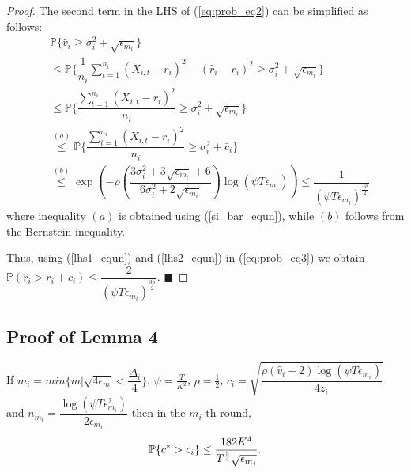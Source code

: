 \begin{proof}
 
The second term in the LHS of (\ref{eq:prob_eq2}) can be simplified as follows:
\begin{align}
&\mathbb{P}\bigg\lbrace \hat{v}_{i}\geq \sigma_{i}^{2}+\sqrt{\epsilon_{m_{i}}}\bigg\rbrace\nonumber\\
&\leq \mathbb{P}\bigg\lbrace \dfrac{1}{n_{i}}\sum_{t=1}^{n_{i}}(X_{i,t}-r_{i})^{2}-(\hat{r}_{i}-r_{i})^{2}\geq \sigma_{i}^{2}+\sqrt{\epsilon_{m_{i}}}\bigg\rbrace\nonumber\\
&\leq \mathbb{P}\bigg\lbrace \dfrac{\sum_{t=1}^{n_{i}}(X_{i,t}-r_{i})^{2}}{n_{i}}\geq \sigma_{i}^{2}+\sqrt{\epsilon_{m_{i}}} \bigg\rbrace\nonumber\\
&\overset{(a)}{\leq} \mathbb{P}\bigg\lbrace \dfrac{\sum_{t=1}^{n_{i}}(X_{i,t}-r_{i})^{2}}{n_{i}}\geq \sigma_{i}^{2} + \bar{c}_i\bigg\rbrace \nonumber\\
&\overset{(b)}{\leq} \exp\left(- \rho \left(\dfrac{3\sigma_{i}^{2}+3\sqrt{\epsilon_{m_{i}}} + 6}{6\sigma_i^2 + 2\sqrt{\epsilon_{m_i}}} \right)\log(\psi  T\epsilon_{m_{i}})\right)
\le \dfrac{1}{(\psi  T\epsilon_{m_{i}})^{\frac{3\rho}{2}}}
\label{lhs2_equn}
\end{align}
where inequality $(a)$ is obtained using (\ref{si_bar_equn}), while $(b)$ follows from the Bernstein inequality. 

Thus, using (\ref{lhs1_equn}) and (\ref{lhs2_equn}) in (\ref{eq:prob_eq3}) we obtain $\mathbb{P}(\hat{r}_{i}> r_{i} + c_{i})\le \dfrac{2}{(\psi  T\epsilon_{m_{i}})^{\frac{3\rho}{2}}}$.
\hfill $\blacksquare$	
\end{proof}


\subsection{Proof of Lemma 4}
\label{App:Lemma:4}
\begin{lemma}
If $m_i = min\lbrace m|\sqrt{4\epsilon_{m} } < \dfrac{\Delta_i}{4} \rbrace $, $\psi=\frac{T}{ K^2}$, $\rho=\frac{1}{2}$,  $c_{i} =\sqrt{\dfrac{\rho(\hat{v}_i + 2)\log (\psi T\epsilon_{m_{i}})}{4 z_{i}}}$ and $n_{m_i}=\dfrac{\log{(\psi T\epsilon_{m_{i}}^{2})}}{2\epsilon_{m_{i}}}$ then in the $m_i$-th round, 
\begin{align*}
\mathbb{P}\lbrace c^{*} > c_i \rbrace  \leq \dfrac{182 K^4}{T^{\frac{5}{4}}\sqrt{\epsilon_{m_i}}}.
\end{align*}
\end{lemma}


